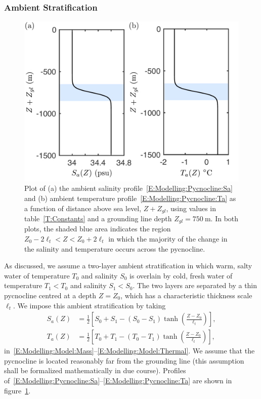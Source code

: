 \documentclass{jfm}
\begin{document}
\subsubsection{Ambient Stratification}\label{S:Model:Pycnocline}
\begin{figure}
\centering
\includegraphics[scale =0.4]{fig2_ambient_temp_and_salinity}
\caption{Plot of (a) the ambient salinity profile~\eqref{E:Modelling:Pycnocline:Sa} and (b) ambient temperature profile~\eqref{E:Modelling:Pycnocline:Ta} as a function of distance above sea level, $Z + Z_{gl}$, using values in table~\ref{T:Constants} and a grounding line depth $Z_{gl} = 750~\si{\meter}$. In both plots, the shaded blue area indicates the region $Z_0 - 2\ell_t < Z < Z_0 + 2\ell_t$ in which the majority of the change in the salinity and temperature occurs across the pycnocline.}\label{fig:Pycnocline_Profiles}
\end{figure}

As discussed, we assume a two-layer ambient stratification in which warm, salty water of temperature $T_0$ and salinity $S_0$ is overlain by cold, fresh water of temperature $T_1 < T_0$ and salinity $S_1 < S_0$. The two layers are separated by a thin pycnocline centred at a depth $Z = Z_0$, which has a characteristic thickness scale $\ell_t$. We impose this ambient stratification by taking
\begin{align}
S_a(Z) &= \frac{1}{2}\left[S_0 + S_1 - (S_0 - S_1)\tanh\left(\frac{Z - Z_0}{\ell_t}\right)\right],\label{E:Modelling:Pycnocline:Sa}\\
T_a(Z) &= \frac{1}{2}\left[T_0 + T_1 - (T_0 - T_1)\tanh\left(\frac{Z - Z_0}{\ell_t}\right)\right],\label{E:Modelling:Pycnocline:Ta}
\end{align}
in~\eqref{E:Modelling:Model:Mass}--\eqref{E:Modelling:Model:Thermal}. We assume that the pycnocline is located reasonably far from the grounding line (this assumption shall be formalized mathematically in due course). Profiles of~\eqref{E:Modelling:Pycnocline:Sa}--\eqref{E:Modelling:Pycnocline:Ta} are shown in figure~\ref{fig:Pycnocline_Profiles}.
\end{document}
